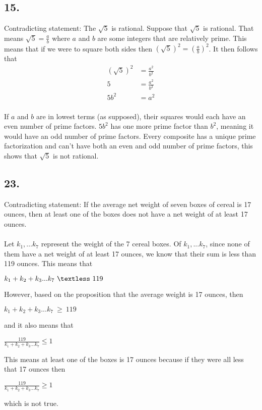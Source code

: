 \documentclass[12]{scrartcl}
\begin{document}
\subsection*{15.}
Contradicting statement: The $\sqrt{5}$ is rational. 
Suppose that $\sqrt{5}$ is rational. That means $\sqrt{5} = \frac{a}{b}$ where $a$ and $b$ are some integers that are relatively prime. This means that if we were to square both sides then $(\sqrt{5})^2 = (\frac{a}{b})^2$. It then follows that
\begin{align*} 
(\sqrt{5})^2 &= \frac{a^2}{b^2}
\\ 5 &= \frac{a^2}{b^2}
\\ 5b^2 &= a^2\\
\end{align*}

If $a$ and $b$ are in lowest terms (as supposed), their squares would each have an even number of prime factors. $5b^2$ has one more prime factor than $b^2$, meaning it would have an odd number of prime factors. Every composite has a unique prime factorization and can't have both an even and odd number of prime factors, this shows that $\sqrt{5}$ is not rational. 

\subsection*{23.}
Contradicting statement: If the average net weight of seven boxes of cereal is 17 ounces, then at least one of the boxes does not have a net weight of at least 17 ounces. \\
\\
Let $k_1, … k_7$ represent the weight of the 7 cereal boxes. Of $k_1, ... k_7$, since none of them have a net weight of at least 17 ounces, we know that their sum is less than 119 ounces. This means that \\
\begin{center} $k_1 + k_2 + k_3... k_7 \  \textless \ 119$ \end{center}
However, based on the proposition that the average weight is 17 ounces, then 
\begin{center} $k_1 + k_2 + k_3... k_7 \  \geq \ 119$ \end{center} 
and it also means that 
\begin{center} $\frac{119} {k_1 + k_2 + k_3... k_7}  \leq 1$ \end{center} 
This means at least one of the boxes is 17 ounces because if they were all less that 17 ounces then
\begin{center} $\frac{119} {k_1 + k_2 + k_3... k_7}  \geq 1$ \end{center} 
which is not true. 
\end{document}

